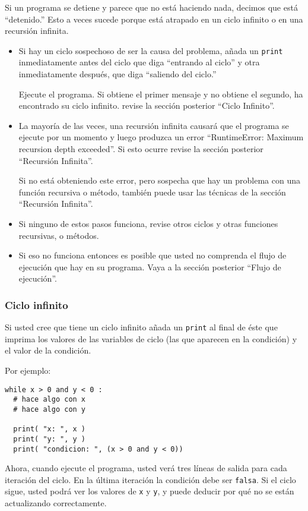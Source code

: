 Si un programa se detiene y parece que no está haciendo nada, decimos
que está ``detenido.'' Esto a veces sucede porque está atrapado
en un ciclo infinito o en una recursión infinita.
\begin{itemize}
\item Si hay un ciclo sospechoso de ser la causa del problema, añada un
\texttt{print} inmediatamente antes del ciclo que diga ``entrando
al ciclo'' y otra inmediatamente después, que diga ``saliendo del
ciclo.''

Ejecute el programa. Si obtiene el primer mensaje y no obtiene el
segundo, ha encontrado su ciclo infinito. revise la sección posterior
``Ciclo Infinito''.
\item La mayoría de las veces, una recursión infinita causará que el programa
se ejecute por un momento y luego produzca un error ``RuntimeError:
Maximum recursion depth exceeded''. Si esto ocurre revise la sección
posterior ``Recursión Infinita''.

Si no está obteniendo este error, pero sospecha que hay un problema
con una función recursiva o método, también puede usar las técnicas
de la sección ``Recursión Infinita''.
\item Si ninguno de estos pasos funciona, revise otros ciclos y otras funciones
recursivas, o métodos.
\item Si eso no funciona entonces es posible que usted no comprenda el flujo
de ejecución que hay en su programa. Vaya a la sección posterior ``Flujo
de ejecución''.
\end{itemize}

\subsubsection{Ciclo infinito}

  

Si usted cree que tiene un ciclo infinito añada un \texttt{print}
al final de éste que imprima los valores de las variables de ciclo
(las que aparecen en la condición) y el valor de la condición.

Por ejemplo:
\begin{lstlisting}
while x > 0 and y < 0 :
  # hace algo con x
  # hace algo con y

  print( "x: ", x )
  print( "y: ", y )
  print( "condicion: ", (x > 0 and y < 0))
\end{lstlisting}
 Ahora, cuando ejecute el programa, usted verá tres líneas de salida
para cada iteración del ciclo. En la última iteración la condición
debe ser \texttt{falsa}. Si el ciclo sigue, usted podrá ver los valores
de \texttt{x} y \texttt{y}, y puede deducir por qué no se están actualizando
correctamente.

